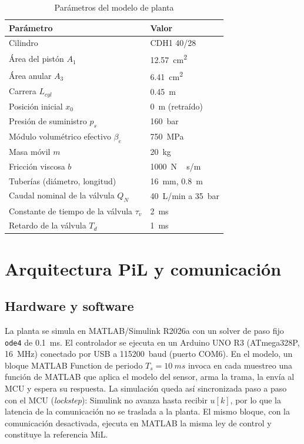 \documentclass[conference]{IEEEtran}
\begin{document}
\begin{table}[H]
\centering
\caption{Parámetros del modelo de planta}
\label{tab:planta}
\small
\begin{tabularx}{\columnwidth}{Ll}
\toprule
Parámetro & Valor \\
\midrule
Cilindro \cite{rexroth} & CDH1 40/28 \\
Área del pistón $A_1$ & \SI{12.57}{cm^2} \\
Área anular $A_3$ & \SI{6.41}{cm^2} \\
Carrera $L_{cyl}$ & \SI{0.45}{m} \\
Posición inicial $x_0$ & \SI{0}{m} (retraído) \\
Presión de suministro $p_s$ & \SI{160}{bar} \\
Módulo volumétrico efectivo $\beta_e$ & \SI{750}{MPa} \\
Masa móvil $m$ & \SI{20}{kg} \\
Fricción viscosa $b$ & \SI{1000}{N\,s/m} \\
Tuberías (diámetro, longitud) & \SI{16}{mm}, \SI{0.8}{m} \\
Caudal nominal de la válvula $Q_N$ & \SI{40}{L/min} a \SI{35}{bar} \\
Constante de tiempo de la válvula $\tau_v$ & \SI{2}{ms} \\
Retardo de la válvula $T_d$ & \SI{1}{ms} \\
\bottomrule
\end{tabularx}
\end{table}

\section{Arquitectura PiL y comunicación}
\label{sec:arq}

\subsection{Hardware y software}
La planta se simula en MATLAB/Simulink R2026a con un solver de paso fijo \texttt{ode4} de \SI{0.1}{ms}. El controlador se ejecuta en un Arduino UNO R3 (ATmega328P, \SI{16}{MHz}) conectado por USB a \SI{115200}{baud} (puerto COM6). En el modelo, un bloque MATLAB Function de periodo $T_s=\SI{10}{ms}$ invoca en cada muestreo una función de MATLAB que aplica el modelo del sensor, arma la trama, la envía al MCU y espera su respuesta. La simulación queda así sincronizada paso a paso con el MCU (\textit{lockstep}): Simulink no avanza hasta recibir $u[k]$, por lo que la latencia de la comunicación no se traslada a la planta. El mismo bloque, con la comunicación desactivada, ejecuta en MATLAB la misma ley de control y constituye la referencia MiL.
\end{document}
